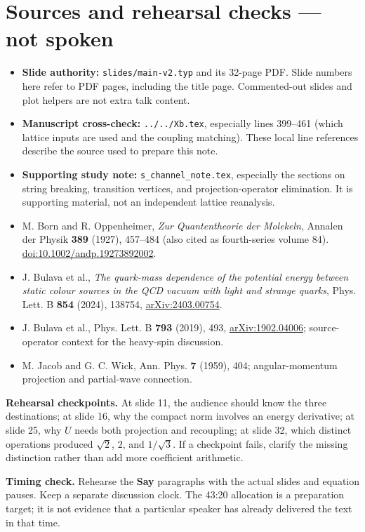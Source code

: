 \documentclass[11pt,a4paper]{article}
\begin{document}
\section*{Sources and rehearsal checks --- not spoken}
\begin{itemize}
\item \textbf{Slide authority:} \texttt{slides/main-v2.typ} and its 32-page
PDF. Slide numbers here refer to PDF pages, including the title page.
Commented-out slides and plot helpers are not extra talk content.
\item \textbf{Manuscript cross-check:} \texttt{../../Xb.tex}, especially
lines 399--461 (which lattice inputs are used and the coupling matching).
These local line references describe the source used to prepare this note.
\item \textbf{Supporting study note:} \texttt{s\_channel\_note.tex},
especially the sections on string breaking, transition vertices, and
projection-operator elimination. It is supporting material, not an
independent lattice reanalysis.
\item M. Born and R. Oppenheimer, \emph{Zur Quantentheorie der Molekeln},
Annalen der Physik \textbf{389} (1927), 457--484
(also cited as fourth-series volume 84).
\href{https://doi.org/10.1002/andp.19273892002}{doi:10.1002/andp.19273892002}.
\item J. Bulava et al., \emph{The quark-mass dependence of the potential
energy between static colour sources in the QCD vacuum with light and
strange quarks}, Phys. Lett. B \textbf{854} (2024), 138754,
\href{https://arxiv.org/abs/2403.00754}{arXiv:2403.00754}.
\item J. Bulava et al., Phys. Lett. B \textbf{793} (2019), 493,
\href{https://arxiv.org/abs/1902.04006}{arXiv:1902.04006}; source-operator
context for the heavy-spin discussion.
\item M. Jacob and G. C. Wick, Ann. Phys. \textbf{7} (1959), 404;
angular-momentum projection and partial-wave connection.
\end{itemize}

\textbf{Rehearsal checkpoints.} At slide 11, the audience should know the
three destinations; at slide 16, why the compact norm involves an energy
derivative; at slide 25, why $U$ needs both projection and recoupling;
at slide 32, which distinct operations produced $\sqrt2$, $2$, and
$1/\sqrt3$. If a checkpoint fails, clarify the missing distinction
rather than add more coefficient arithmetic.

\textbf{Timing check.} Rehearse the \textbf{Say} paragraphs with the actual
slides and equation pauses. Keep a separate discussion clock. The 43:20
allocation is a preparation target; it is not evidence that a particular
speaker has already delivered the text in that time.
\end{document}
